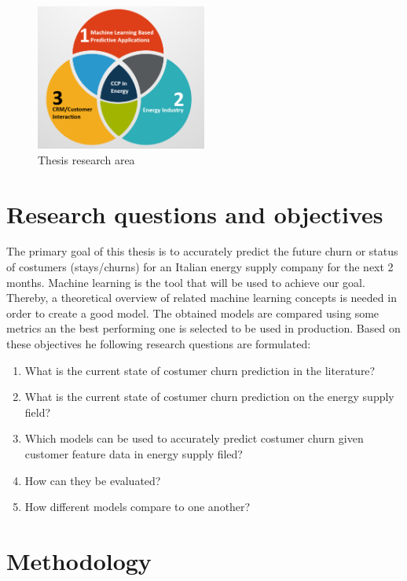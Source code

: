 \documentclass[LaM,binding=0.6cm, english]{sapthesis}
\begin{document}
\begin{figure}[h!]
    \includegraphics[width=0.5\textwidth]{Thesis-Research-Area.png}
    \centering
    \caption{Thesis research area}
    \label{fig:research-area}
\end{figure}

\section{Research questions and objectives}

The primary goal of this thesis is to accurately predict the future churn or status of costumers (stays/churns) for an Italian energy supply company for the next 2 months. Machine learning is the tool that will be used to achieve our goal. Thereby, a theoretical overview of related machine learning concepts is needed in order to create a good model. The obtained models are compared using some metrics an the best performing one is selected to be used in production. Based on these objectives he following research questions are formulated:

\begin{enumerate}
	\item What is the current state of costumer churn prediction in the 			literature?
  	\item What is the current state of costumer churn prediction on the energy supply field?
  	\item Which models can be used to accurately predict costumer churn given customer feature data in energy supply filed?
  	\item How can they be evaluated?
  	\item How different models compare to one another?
\end{enumerate}

\section{Methodology}
\end{document}
